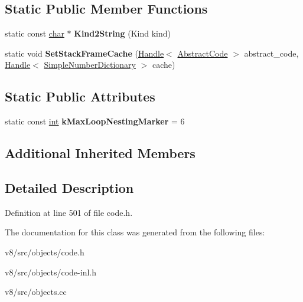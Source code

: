 \subsection*{Static Public Member Functions}
\begin{DoxyCompactItemize}
\item 
\mbox{\label{classv8_1_1internal_1_1AbstractCode_aa5957bbcf64da041514a3c6312bb838b}} 
static const \mbox{\hyperlink{classchar}{char}} $\ast$ {\bfseries Kind2\+String} (Kind kind)
\item 
\mbox{\label{classv8_1_1internal_1_1AbstractCode_a32e4d2b6f7a106c79458ed3b8f0e2f22}} 
static void {\bfseries Set\+Stack\+Frame\+Cache} (\mbox{\hyperlink{classv8_1_1internal_1_1Handle}{Handle}}$<$ \mbox{\hyperlink{classv8_1_1internal_1_1AbstractCode}{Abstract\+Code}} $>$ abstract\+\_\+code, \mbox{\hyperlink{classv8_1_1internal_1_1Handle}{Handle}}$<$ \mbox{\hyperlink{classv8_1_1internal_1_1SimpleNumberDictionary}{Simple\+Number\+Dictionary}} $>$ cache)
\end{DoxyCompactItemize}
\subsection*{Static Public Attributes}
\begin{DoxyCompactItemize}
\item 
\mbox{\label{classv8_1_1internal_1_1AbstractCode_a119579f6132f2cc2e697fd094f34f409}} 
static const \mbox{\hyperlink{classint}{int}} {\bfseries k\+Max\+Loop\+Nesting\+Marker} = 6
\end{DoxyCompactItemize}
\subsection*{Additional Inherited Members}


\subsection{Detailed Description}


Definition at line 501 of file code.\+h.



The documentation for this class was generated from the following files\+:\begin{DoxyCompactItemize}
\item 
v8/src/objects/code.\+h\item 
v8/src/objects/code-\/inl.\+h\item 
v8/src/objects.\+cc\end{DoxyCompactItemize}
